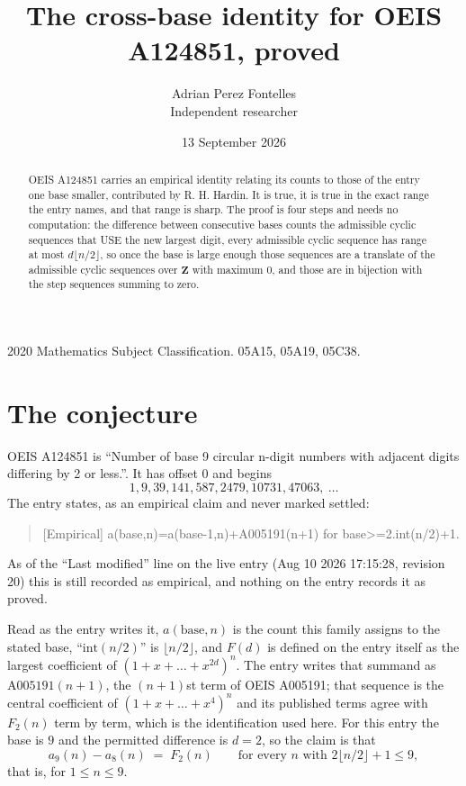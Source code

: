 \documentclass[11pt,a4paper]{article}
\title{The cross-base identity for OEIS A124851, proved}
\author{Adrian Perez Fontelles\\ \small Independent researcher}
\date{13 September 2026}
\theoremstyle{plain}
\theoremstyle{definition}
\begin{document}
\maketitle

\begin{abstract}
OEIS A124851 carries an empirical identity relating its counts to those of the entry one base
smaller, contributed by R. H. Hardin. It is true, it is true in the exact range the entry
names, and that range is sharp. The proof is four steps and needs no computation: the
difference between consecutive bases counts the admissible cyclic sequences that USE the new
largest digit, every admissible cyclic sequence has range at most $d\lfloor n/2\rfloor$, so
once the base is large enough those sequences are a translate of the admissible cyclic
sequences over $\mathbf{Z}$ with maximum $0$, and those are in bijection with the step
sequences summing to zero.
\end{abstract}

\noindent\small 2020 Mathematics Subject Classification. 05A15, 05A19, 05C38.\normalsize

\section{The conjecture}

OEIS A124851 is ``Number of base 9 circular n-digit numbers with adjacent digits differing by 2 or less.''. It has offset $0$ and begins
\[
1, 9, 39, 141, 587, 2479, 10731, 47063,\ \dots
\]
The entry states, as an empirical claim and never marked settled:
\begin{quote}
[Empirical] a(base,n)=a(base-1,n)+A005191(n+1) for base>=2.int(n/2)+1.
\end{quote}
As of the ``Last modified'' line on the live entry (Aug 10 2026 17:15:28, revision 20)
this is still recorded as empirical, and nothing on the entry records it as proved.

Read as the entry writes it, $a(\mathrm{base},n)$ is the count this family assigns to the
stated base, ``$\mathrm{int}(n/2)$'' is $\lfloor n/2\rfloor$, and $F(d)$ is defined on the
entry itself as the largest coefficient of $(1+x+\dots+x^{2d})^{n}$. The entry writes that summand as $\mathrm{A005191}(n+1)$, the $(n+1)$st term of OEIS A005191; that sequence is the central coefficient of $(1+x+\dots+x^{4})^{n}$ and its published terms agree with $F_{2}(n)$ term by term, which is the identification used here. For this entry
the base is $9$ and the permitted difference is $d=2$, so the claim is that
\[
a_{9}(n)-a_{8}(n)\;=\;F_{2}(n)
\qquad\text{for every } n \text{ with } 2\lfloor n/2\rfloor+1\le9,
\]
that is, for $1\le n\le9$.
\end{document}
